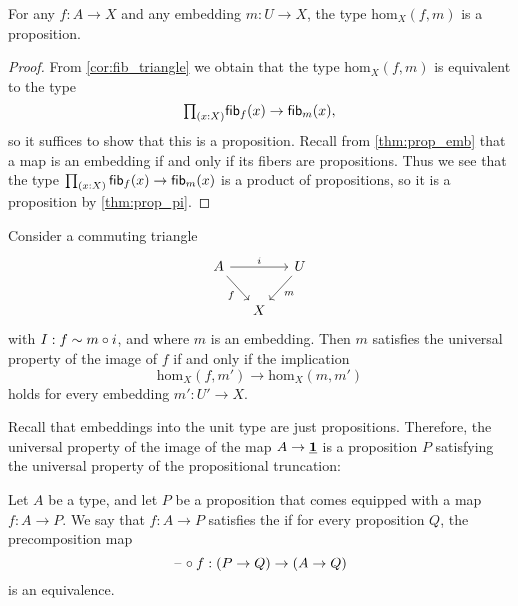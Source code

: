 \begin{lem}
For any $f:A\to X$ and any embedding $m:U\to X$, the type $\mathrm{hom}_X(f,m)$ is a proposition.
\end{lem}

\begin{proof}
From \cref{cor:fib_triangle} we obtain that the type $\mathrm{hom}_X(f,m)$ is equivalent to the type
\begin{equation*}
\prd{x:X}\fib{f}{x}\to\fib{m}{x},
\end{equation*}
so it suffices to show that this is a proposition. 
Recall from \cref{thm:prop_emb} that a map is an embedding if and only if its fibers are propositions.
Thus we see that the type $\prd{x:X}\fib{f}{x}\to\fib{m}{x}$ is a product of propositions, so it is a proposition by \cref{thm:prop_pi}.
\end{proof}

\begin{cor}\label{cor:image_up}
Consider a commuting triangle
\begin{equation*}
\begin{tikzcd}[column sep=small]
A \arrow[rr,"i"] \arrow[dr,swap,"f"] & & U \arrow[dl,"m"] \\
& X
\end{tikzcd}
\end{equation*}
with $I:f\sim m\circ i$, and where $m$ is an embedding. Then $m$ satisfies the universal property of the image of $f$ if and only if the implication
\begin{equation*}
\mathrm{hom}_X(f,m')\to\mathrm{hom}_X(m,m')
\end{equation*}
holds for every embedding $m':U'\to X$. 
\end{cor}

Recall that embeddings into the unit type are just propositions.
Therefore, the universal property of the image of the map $A\to\underline{\mathbf{1}}$ is a proposition $P$ satisfying the universal property of the propositional truncation:

\begin{defn}
Let $A$ be a type, and let $P$ be a proposition that comes equipped with a map $f:A\to P$. We say that $f:A\to P$ satisfies the  if for every proposition $Q$, the precomposition map
\begin{equation*}
\mathord{\hspace{1pt}\text{--}\hspace{1pt}}\circ f:(P\to Q)\to (A\to Q)
\end{equation*}
is an equivalence.
\end{defn}

